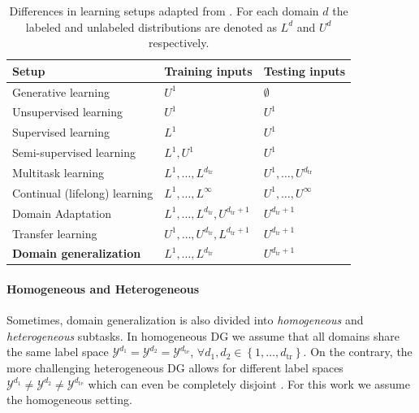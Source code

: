 \begin{table}[t]
    \centering
    \begin{tabular}{lll}
    \toprule
    \textbf{Setup} & \textbf{Training inputs}  & \textbf{Testing inputs} \\
    \midrule
        Generative learning & $U^1$ & $\emptyset$ \\ 
        Unsupervised learning & $U^1$ & $U^1$  \\ 
        Supervised learning & $L^1$ & $U^1$ \\ 
        Semi-supervised learning & $L^{1}, U^{1}$ & $U^1$ \\ 
        Multitask learning & $L^{1}, \ldots, L^{d_{\mathrm{tr}}}$ & $U^{1}, \ldots, U^{d_{\mathrm{tr}}}$ \\ 
        Continual (lifelong) learning & $L^{1}, \ldots, L^{\infty}$ & $U^{1}, \ldots, U^{\infty}$ \\ 
        Domain Adaptation & $L^{1}, \ldots, L^{d_{\mathrm{tr}}}, U^{d_{\mathrm{tr}}+1}$ & $U^{d_{\mathrm{tr}}+1}$ \\ 
        Transfer learning & $U^{1}, \ldots, U^{d_{\mathrm{tr}}}, L^{d_{\mathrm{tr}}+1}$ & $U^{d_{\mathrm{tr}}+1}$ \\ 
        \textbf{Domain generalization} & $L^{1}, \ldots, L^{d_{\mathrm{tr}}}$ & $U^{d_{\mathrm{tr}}+1}$ \\ 
    \bottomrule
    \end{tabular}
    \caption[Differences in learning setups]{Differences in learning setups adapted from \citet{gulrajani2020search}. For each domain $d$ the labeled and unlabeled distributions are denoted as $L^d$ and $U^d$ respectively.}
    \label{tab:learning_setups}
\end{table}

\paragraph{Homogeneous and Heterogeneous}
Sometimes, domain generalization is also divided into \emph{homogeneous} and \emph{heterogeneous} subtasks. In homogeneous DG we assume that all domains share the same label space $\mathcal{Y}^{d_1} = \mathcal{Y}^{d_2} = \mathcal{Y}^{d_\mathrm{te}}$, $\forall d_1, d_2 \in \left\{1, \ldots, d_{\mathrm{tr}}\right\}$. On the contrary, the more challenging heterogeneous DG allows for different label spaces $\mathcal{Y}^{d_1} \neq \mathcal{Y}^{d_2} \neq \mathcal{Y}^{d_\mathrm{te}}$ which can even be completely disjoint \citep{LiZYLSH19}. For this work we assume the homogeneous setting.

